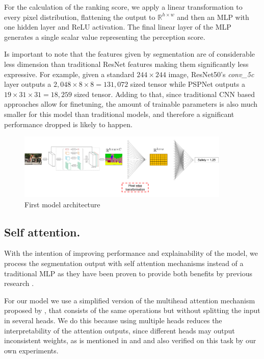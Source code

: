 For the calculation of the ranking score, we apply a linear transformation to every pixel distribution, flattening the output to
$\mathbb{R}^{h \times w}$  and then an MLP with one hidden layer and ReLU activation. The final linear layer
of the MLP generates a single scalar value representing the perception score.

Is important to note that the features given by  segmentation are  of considerable less dimension
than traditional ResNet features making them  significantly less expressive. For example, given a standard $244 \times 244$ image,
ResNet50's \textit{conv\_5c} layer outputs a $2,048 \times 8 \times 8 = 131,072$ sized
tensor while PSPNet outputs a $19 \times 31 \times 31 = 18,259$ sized tensor. Adding to that,
since traditional CNN based approaches allow for finetuning, the amount of trainable parameters
is also much smaller for this model than traditional models, and therefore a significant
performance dropped is likely to happen.

\begin{figure}[ht]
	\begin{center}
	\includegraphics[width=0.9\textwidth]{./figures/segrank_1.png}
	\caption[First model architecture]{First model architecture}
	\label{fig:segrank_1}
	\end{center}
\end{figure}

\subsection{Self attention.}\label{section:self-attn}
With the intention of improving performance and explainability of the model, we process
the segmentation output with self attention mechanisms instead of a traditional MLP as
they have been proven to provide both benefits by previous research \cite{vaswani_attention, wiegreffe_attention, cordonnier_relationship}.

For our model we use a simplified version of the multihead attention mechanism
proposed by , that consists of the same operations but
without splitting the input in several heads. We do this because using multiple heads
reduces the interpretability of the attention outputs, since different heads may output
inconsistent weights, as is mentioned in  and  and
also verified on this task by our own experiments.

